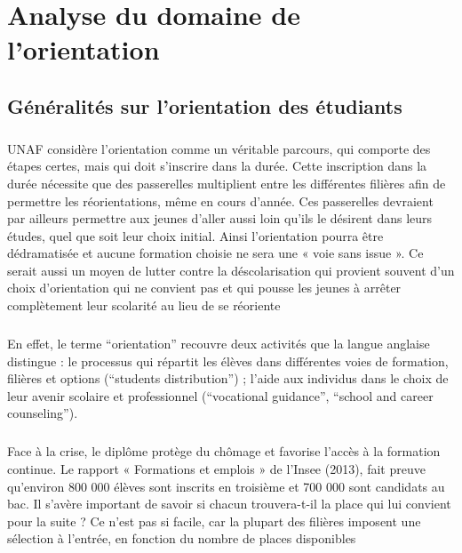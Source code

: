 \chapter{Analyse du domaine de l'orientation  \cite{OrBk1} \cite{OrBk2} \cite{OrBk3} \cite{OrBk4} \cite{OrBk5}}
\section{Généralités sur l’orientation des étudiants}
\paragraph{}
\ac {UNAF}  considère l’orientation comme un  véritable parcours, qui comporte des étapes  certes, mais qui doit s’inscrire dans la durée.  Cette inscription dans la durée nécessite que  des passerelles multiplient entre les différentes filières afin de permettre les  réorientations, même en cours d’année. Ces  passerelles devraient par ailleurs permettre  aux jeunes d’aller aussi loin qu’ils le désirent  dans leurs études, quel que soit leur choix  initial. Ainsi l’orientation pourra être  dédramatisée et aucune formation choisie ne  sera une « voie sans issue ».  Ce serait aussi un moyen de lutter contre la  déscolarisation qui provient souvent d’un  choix d’orientation qui ne convient pas et qui  pousse les jeunes à arrêter complètement leur  scolarité au lieu de se réoriente
\paragraph{}
En effet, le terme “orientation” recouvre deux activités que la langue anglaise distingue : le processus qui répartit les élèves dans différentes voies de formation, filières et options (“students distribution”) ; l’aide aux individus dans le choix de leur avenir scolaire et professionnel (“vocational guidance”, “school and career counseling”).
\paragraph{}
Face à la crise, le diplôme protège du  chômage et favorise l’accès à la  formation continue.  Le rapport  « Formations et emplois » de l’Insee (2013), fait preuve qu’environ 800 000 élèves sont inscrits en  troisième et 700 000 sont candidats au  bac. Il s’avère important de savoir si chacun trouvera-t-il la place qui  lui convient pour la suite ? Ce n’est pas si facile, car la plupart des filières imposent une sélection à  l’entrée, en fonction du nombre de  places disponibles
